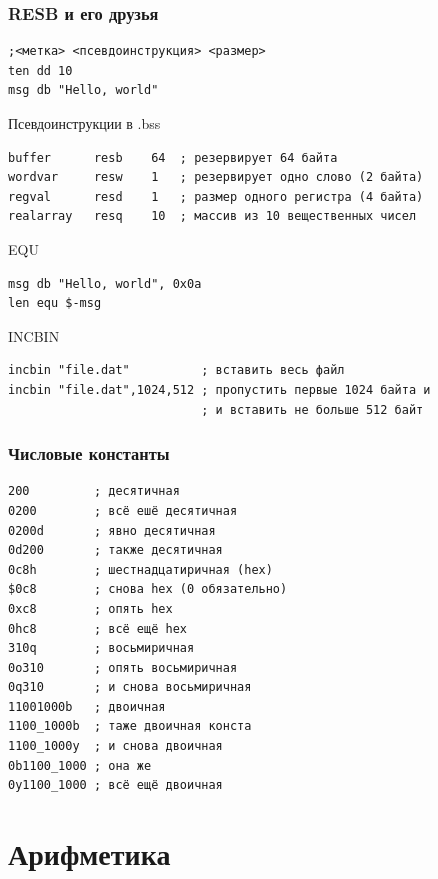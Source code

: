\documentclass{beamer}
\begin{document}
    \begin{frame}[fragile]
        \frametitle{RESB и его друзья}\small
        \begin{verbatim}
;<метка> <псевдоинструкция> <размер> 
ten dd 10 
msg db "Hello, world"\end{verbatim}
        \begin{block}{Псевдоинструкции в .bss}
            \begin{verbatim}
buffer      resb    64  ; резервирует 64 байта
wordvar     resw    1   ; резервирует одно слово (2 байта)
regval      resd    1   ; размер одного регистра (4 байта)
realarray   resq    10  ; массив из 10 вещественных чисел\end{verbatim}
        \end{block}
        \begin{block}{EQU}
        \begin{verbatim}
msg db "Hello, world", 0x0a
len equ $-msg\end{verbatim}
        \end{block}
        \begin{block}{INCBIN}
        \begin{verbatim}
incbin "file.dat"          ; вставить весь файл
incbin "file.dat",1024,512 ; пропустить первые 1024 байта и
                           ; и вставить не больше 512 байт\end{verbatim}
        \end{block}
\end{frame}
    \begin{frame}[fragile]
        \frametitle{Числовые константы}
        \begin{verbatim}
200         ; десятичная
0200        ; всё ешё десятичная
0200d       ; явно десятичная
0d200       ; также десятичная
0c8h        ; шестнадцатиричная (hex)
$0c8        ; снова hex (0 обязательно)
0xc8        ; опять hex
0hc8        ; всё ещё hex
310q        ; восьмиричная
0o310       ; опять восьмиричная
0q310       ; и снова восьмиричная
11001000b   ; двоичная
1100_1000b  ; таже двоичная конста
1100_1000y  ; и снова двоичная
0b1100_1000 ; она же
0y1100_1000 ; всё ещё двоичная       
        \end{verbatim}
\end{frame}

    \section{Арифметика}
\end{document}
